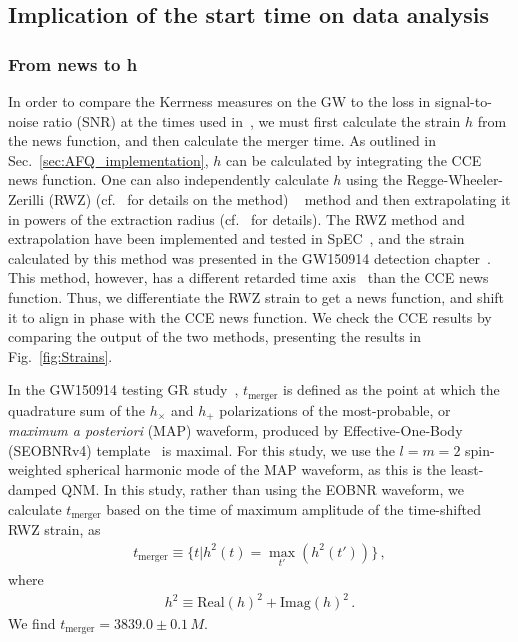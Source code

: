 \subsection{Implication of the start time on data analysis}
\label{sec:DataAnalysis}
\subsubsection{From news to h}
\label{sec:hoft}
In order to compare the Kerrness measures on the GW to the loss in signal-to-noise ratio (SNR) at the times used in~\cite{TheLIGOScientific:2016src}, we must first calculate the strain $h$ from the news function, and then calculate the merger time. As outlined in Sec.~\ref{sec:AFQ_implementation}, $h$ can be calculated by integrating the CCE news function. One can also independently calculate $h$ using the Regge-Wheeler-Zerilli (RWZ) (cf.~\cite{RZW} for details on the method) ~\cite{PhysRev.108.1063, PhysRevLett.24.737, PhysRevD.2.2141, Moncrief:1974am} method  and then extrapolating it in powers of the extraction radius (cf.~\cite{Boyle:2009vi} for details). The RWZ method and extrapolation  have been implemented and tested in SpEC~\cite{Boyle:2009vi, Taylor:2013zia}, and the strain calculated by this method was presented in the GW150914 detection chapter~\cite{PhysRevLett.116.061102}. This method, however, has a different retarded time axis~\cite{Boyle:2009vi} than the CCE news function. Thus, we differentiate the RWZ strain to get a news function, and shift it to align in phase with the CCE news function. We check the CCE results by comparing the output of the two methods, presenting the results in Fig.~\ref{fig:Strains}.

In the GW150914 testing GR study~\cite{TheLIGOScientific:2016src}, $t_\mathrm{merger}$ is defined as the point at which the quadrature sum of the $h_\times$ and $h_+$ polarizations of the most-probable, or \textit{maximum a posteriori} (MAP) waveform, produced by Effective-One-Body (SEOBNRv4) template~\cite{Purrer:2015tud} is maximal. For this study, we use the $l=m=2$ spin-weighted spherical harmonic mode of the MAP waveform, as this is the least-damped QNM. In this study, rather than using the EOBNR waveform, we calculate $t_\mathrm{merger}$ based on the time of maximum amplitude of the time-shifted RWZ strain, as
\begin{align}
\label{eq:tmerger}
t_\mathrm{merger} \equiv \{t | h^2(t) = \max_{t'} (h^2(t'))\} \,,
\end{align}
where 
\begin{align}
h^2 \equiv \mathrm{Real} (h)^2 + \mathrm{Imag} (h)^2\,.
\end{align}
We find $t_\mathrm{merger} = 3839.0 \pm 0.1\,M$. 

